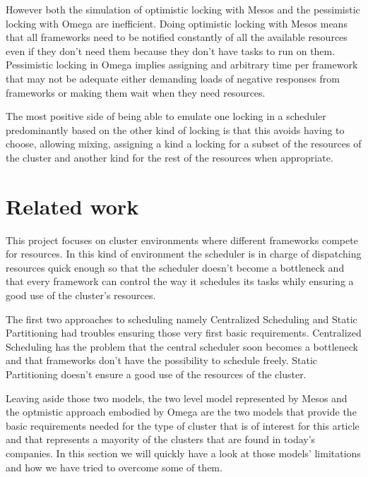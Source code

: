 \documentclass{report}                     %
\begin{document}
However both the simulation of optimistic locking with Mesos and the
pessimistic locking with Omega are inefficient. Doing optimistic
locking with Mesos means that all frameworks need to be notified
constantly of all the available resources even if they don't need them
because they don't have tasks to run on them. Pessimistic locking in
Omega implies assigning and arbitrary time per framework that may not
be adequate either demanding loads of negative responses from
frameworks or making them wait when they need resources. 

The most positive side of being able to emulate one locking in a
scheduler predominantly based on the other kind of locking is that
this avoids having to choose, allowing mixing, assigning a kind a
locking for a subset of the resources of the cluster and another kind
for the rest of the resources when appropriate.





\chapter{Related work}

This project focuses on cluster environments where different
frameworks compete for resources. In this kind of environment the
scheduler is in charge of dispatching resources quick enough
so that the scheduler doesn't become a bottleneck and that every
framework can control the way it schedules its tasks whily ensuring
a good use of the cluster's resources. 

The first two approaches to scheduling namely Centralized Scheduling
and Static Partitioning had troubles ensuring those very first basic
requirements. Centralized Scheduling has the problem that the central
scheduler soon becomes a bottleneck and that frameworks don't have
the possibility to schedule freely. Static Partitioning doesn't ensure a good
use of the resources of the cluster.

Leaving aside those two models, the two level model represented by
Mesos and the optmistic approach embodied by Omega are the
two models that provide the basic requirements needed for the type of
cluster that is of interest for this article and that represents a
mayority of the clusters that are found in today's companies. In this
section we will quickly have a look at those models' limitations and
how we have tried to overcome some of them.
\end{document}
